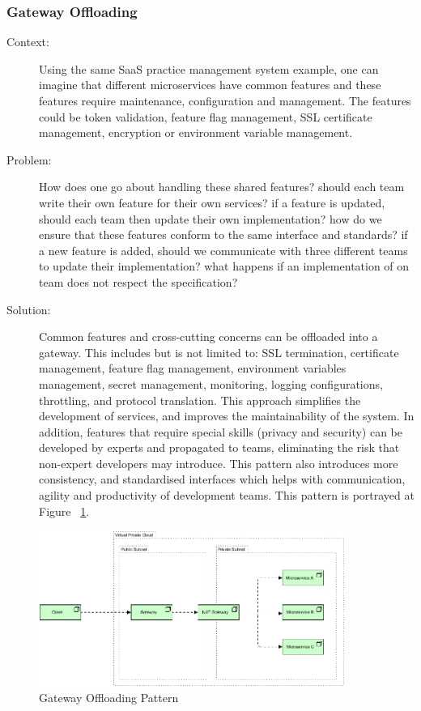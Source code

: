 \documentclass{bmcart}
\begin{document}
\subsubsection{Gateway Offloading}

\begin{description}
  \item[Context:] Using the same SaaS practice management system example, one can imagine that different microservices have common features and these features require maintenance, configuration and management. The features could be token validation, feature flag management, SSL certificate management, encryption or environment variable management. 
  \item[Problem:] How does one go about handling these shared features? should each team write their own feature for their own services? if a feature is updated, should each team then update their own implementation? how do we ensure that these features conform to the same interface and standards? if a new feature is added, should we communicate with three different teams to update their implementation? what happens if an implementation of on team does not respect the specification?
  \item[Solution:] Common features and cross-cutting concerns can be offloaded into a gateway. This includes but is not limited to: SSL termination, certificate management, feature flag management, environment variables management, secret management, monitoring, logging configurations, throttling, and protocol translation. This approach simplifies the development of services, and improves the maintainability of the system.  In addition, features that require special skills (privacy and security) can be developed by experts and propagated to teams, eliminating the risk that non-expert developers may introduce. This pattern also introduces more consistency, and standardised interfaces which helps with communication, agility and productivity of development teams. This pattern is portrayed at Figure ~\ref{gatewayOffloading}.   

\end{description}

\begin{figure}[h]
  \includegraphics[width=10cm]{Media/Gateway Offloading.jpg}
  \caption{Gateway Offloading Pattern}
  \label{gatewayOffloading}
\end{figure}
\end{document}
